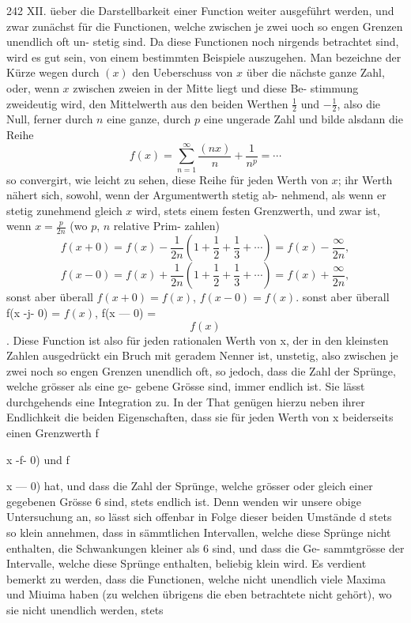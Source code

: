 \documentclass[11pt,a4paper]{article}
\begin{document}
{{%
242  XII.    üeber  die  Darstellbarkeit  einer  Function
weiter  ausgeführt  werden,  und  zwar  zunächst  für  die  Functionen,
welche  zwischen  je  zwei  uoch  so  engen  Grenzen  unendlich  oft  un-
stetig sind.
Da  diese  Functionen  noch  nirgends  betrachtet  sind,  wird  es  gut
sein,  von  einem  bestimmten  Beispiele  auszugehen.  Man  bezeichne  der
Kürze  wegen  durch  $(x)$  den  Ueberschuss  von  $x$  über  die  nächste  ganze
Zahl,  oder,  wenn  $x$  zwischen  zweien  in  der  Mitte  liegt  und  diese  Be-
stimmung zweideutig  wird,  den  Mittelwerth  aus  den  beiden  Werthen
$\frac{1}{2}$  und  $-\frac{1}{2}$,  also  die  Null,  ferner  durch  $n$  eine  ganze,  durch  $p$  eine
ungerade  Zahl  und  bilde  alsdann  die  Reihe
\[ f(x) = \sum_{n=1}^{\infty} \frac{(nx)}{n} + \frac{1}{n^p} = \cdots \]
so  convergirt,  wie  leicht  zu  sehen,  diese  Reihe  für  jeden  Werth  von  $x$;
ihr  Werth  nähert  sich,  sowohl,  wenn  der  Argumentwerth  stetig  ab-
nehmend, als  wenn  er  stetig  zunehmend  gleich  $x$  wird,  stets einem
festen  Grenzwerth,  und  zwar  ist,  wenn  $x = \frac{p}{2n}$  (wo  $p$,  $n$  relative  Prim-
zahlen)
\[ f(x+0) = f(x) - \frac{1}{2n}\left(1 + \frac{1}{2} + \frac{1}{3} + \cdots\right) = f(x) - \frac{\infty}{2n}, \]
\[ f(x-0) = f(x) + \frac{1}{2n}\left(1 + \frac{1}{2} + \frac{1}{3} + \cdots\right) = f(x) + \frac{\infty}{2n}, \]
sonst  aber  überall  $f(x+0) = f(x)$,  $f(x-0) = f(x)$.
sonst  aber  überall  f(x  -j-  0)  =  $f(x)$,  f(x  ---  0)  =  $$f(x)$$ .
Diese  Function  ist  also  für  jeden  rationalen  Werth  von  x,  der  in
den  kleinsten  Zahlen  ausgedrückt  ein  Bruch  mit  geradem  Nenner  ist,
unstetig,  also  zwischen  je  zwei  noch  so  engen  Grenzen  unendlich  oft,
so  jedoch,  dass  die  Zahl  der  Sprünge,  welche  grösser  als  eine  ge-
gebene Grösse  sind,  immer  endlich  ist.  Sie  lässt  durchgehends  eine
Integration  zu.  In  der  That  genügen  hierzu  neben  ihrer  Endlichkeit
die  beiden  Eigenschaften,  dass  sie  für  jeden  Werth  von  x  beiderseits
einen  Grenzwerth  f{x  -f-  0)  und  f{x  ---  0)  hat,  und  dass  die  Zahl  der
Sprünge,  welche  grösser  oder  gleich  einer  gegebenen  Grösse  6  sind,
stets  endlich  ist.  Denn  wenden  wir  unsere  obige  Untersuchung  an,
so  lässt  sich  offenbar  in  Folge  dieser  beiden  Umstände  d  stets  so  klein
annehmen,  dass  in  sämmtlichen  Intervallen,  welche  diese  Sprünge  nicht
enthalten,  die  Schwankungen  kleiner  als  6  sind,  und  dass  die  Ge-
sammtgrösse  der  Intervalle,  welche  diese  Sprünge  enthalten,  beliebig
klein  wird.
Es  verdient  bemerkt  zu  werden,  dass  die  Functionen,  welche  nicht
unendlich  viele  Maxima  und  Miuima  haben  (zu  welchen  übrigens  die
eben  betrachtete  nicht  gehört),  wo  sie  nicht  unendlich  werden,   stets
\newpage

}}}}
\end{document}
